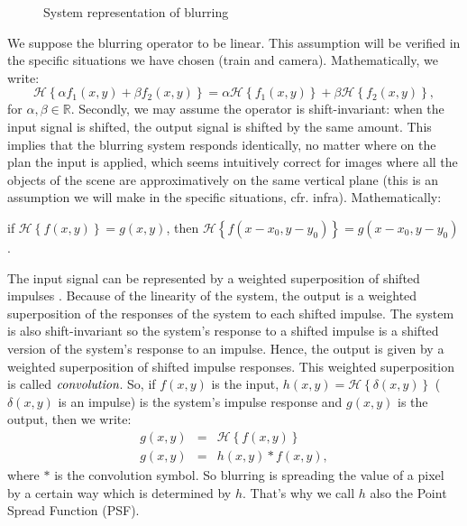 \begin{figure}
\begin{center}
\end{center}
\caption{System representation of blurring}
\label{system}
\end{figure}

We suppose the blurring operator to be linear. This assumption will be verified in the specific situations we have chosen (train and camera). Mathematically, we write:
\begin{equation}
\mathcal{H}\left\lbrace \alpha f_1(x,y) + \beta f_2(x,y) \right\rbrace =  \alpha \mathcal{H}\left\lbrace f_1(x,y)\right\rbrace + \beta \mathcal{H}\left\lbrace f_2(x,y)\right\rbrace,
\end{equation}
for $\alpha, \beta \in \mathbb{R}$.
Secondly, we may assume the operator is shift-invariant: when the input signal is shifted, the output signal is shifted by the same amount. This implies that the blurring system responds identically, no matter where on the plan the input is applied, which seems intuitively correct for images where all the objects of the scene are approximatively on the same vertical plane (this is an assumption we will make in the specific situations, cfr. infra). Mathematically:

if $\mathcal{H}\left\lbrace f(x,y) \right\rbrace = g(x,y)$, then $\mathcal{H}\left\lbrace f(x-x_0,y-y_0) \right\rbrace = g(x-x_0,y-y_0)$.

The input signal can be represented by a weighted superposition of shifted impulses \cite{haykin2007signals}. Because of the linearity of the system, the output is a weighted superposition of the responses of the system to each shifted impulse. The system is also shift-invariant so the system's response to a shifted impulse is a shifted version of the system's response to an impulse. Hence, the output is given by a weighted superposition of shifted impulse responses. This weighted superposition is called $\emph{convolution}$. So, if $f(x,y)$ is the input, $h(x,y)=\mathcal{H}\left\lbrace \delta(x,y) \right\rbrace$ ($\delta(x,y)$ is an impulse) is the system's impulse response and $g(x,y)$ is the output, then we write:
\begin{eqnarray}
g(x,y) &=& \mathcal{H}\left\lbrace f(x,y) \right\rbrace \\
g(x,y) &=& h(x,y) \ast f(x,y),
\end{eqnarray}
where $\ast$ is the convolution symbol. So blurring is spreading the value of a pixel by a certain way which is determined by $h$. That's why we call $h$ also the Point Spread Function (PSF).

